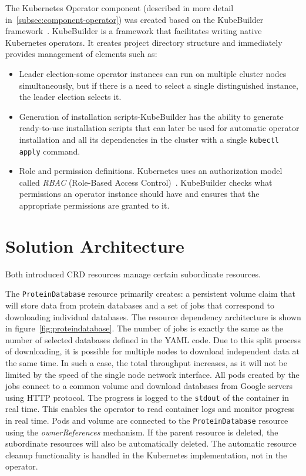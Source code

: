 The Kubernetes Operator component (described in more detail in~\ref{subsec:component-operator}) was created based on the KubeBuilder framework~\cite{kubebuilder}.
KubeBuilder is a framework that facilitates writing native Kubernetes operators.
It creates project directory structure and immediately provides management of elements such as:
\begin{itemize}
    \item Leader election-some operator instances can run on multiple cluster nodes simultaneously, but if there is a need to select a single distinguished instance, the leader election selects it.
    \item Generation of installation scripts-KubeBuilder has the ability to generate ready-to-use installation scripts that can later be used for automatic operator installation and all its dependencies in the cluster with a single \texttt{kubectl apply} command.
    \item Role and permission definitions.
    Kubernetes uses an authorization model called \textit{RBAC} (Role-Based Access Control)~\cite{k8s_rbac}.
    KubeBuilder checks what permissions an operator instance should have and ensures that the appropriate permissions are granted to it.
\end{itemize}


\section{Solution Architecture}

Both introduced CRD resources manage certain subordinate resources.

The \texttt{ProteinDatabase} resource primarily creates: a persistent volume claim that will store data from protein databases and a set of jobs that correspond to downloading individual databases.
The resource dependency architecture is shown in figure~\ref{fig:proteindatabase}.
The number of jobs is exactly the same as the number of selected databases defined in the YAML code.
Due to this split process of downloading, it is possible for multiple nodes to download independent data at the same time.
In such a case, the total throughput increases, as it will not be limited by the speed of the single node network interface.
All pods created by the jobs connect to a common volume and download databases from Google servers using HTTP protocol.
The progress is logged to the \texttt{stdout} of the container in real time.
This enables the operator to read container logs and monitor progress in real time.
Pods and volume are connected to the \texttt{ProteinDatabase} resource using the \textit{ownerReferences} mechanism.
If the parent resource is deleted, the subordinate resources will also be automatically deleted.
The automatic resource cleanup functionality is handled in the Kubernetes implementation, not in the operator.

